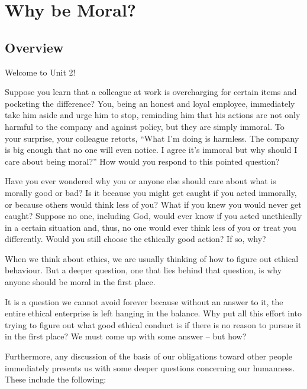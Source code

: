 \documentclass[
]{book}
\begin{document}
\hypertarget{why-be-moral}{%
\chapter{Why be Moral?}\label{why-be-moral}}

\hypertarget{overview-1}{%
\section*{Overview}\label{overview-1}}

Welcome to Unit 2!

Suppose you learn that a colleague at work is overcharging for certain items and pocketing the difference? You, being an honest and loyal employee, immediately take him aside and urge him to stop, reminding him that his actions are not only harmful to the company and against policy, but they are simply immoral. To your surprise, your colleague retorts, ``What I'm doing is harmless. The company is big enough that no one will even notice. I agree it's immoral but why should I care about being moral?'' How would you respond to this pointed question?

Have you ever wondered why you or anyone else should care about what is morally good or bad? Is it because you might get caught if you acted immorally, or because others would think less of you? What if you knew you would never get caught? Suppose no one, including God, would ever know if you acted unethically in a certain situation and, thus, no one would ever think less of you or treat you differently. Would you still choose the ethically good action? If so, why?

When we think about ethics, we are usually thinking of how to figure out ethical behaviour. But a deeper question, one that lies behind that question, is why anyone should be moral in the first place.

It is a question we cannot avoid forever because without an answer to it, the entire ethical enterprise is left hanging in the balance. Why put all this effort into trying to figure out what good ethical conduct is if there is no reason to pursue it in the first place? We must come up with some answer -- but how?

Furthermore, any discussion of the basis of our obligations toward other people immediately presents us with some deeper questions concerning our humanness. These include the following:
\end{document}
